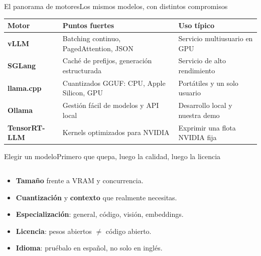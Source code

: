 \begin{frame}{El panorama de motores}{Los mismos modelos, con distintos compromisos}
	\centering\footnotesize
	\setlength{\tabcolsep}{3pt}
	\begin{tabular}{@{}R{2.1cm}R{6.2cm}R{3.9cm}@{}}
		\toprule
		\textbf{Motor}                     & \textbf{Puntos fuertes}                    & \textbf{Uso típico}             \\
		\midrule
		\textbf{\textcolor{rojoUGR}{vLLM}} & Batching continuo, PagedAttention, JSON    & Servicio multiusuario en GPU    \\[1pt]
		\textbf{SGLang}                    & Caché de prefijos, generación estructurada & Servicio de alto rendimiento    \\[1pt]
		\textbf{llama.cpp}                 & Cuantizados GGUF: CPU, Apple Silicon, GPU  & Portátiles y un solo usuario    \\[1pt]
		\textbf{Ollama}                    & Gestión fácil de modelos y API local       & Desarrollo local y nuestra demo \\[1pt]
		\textbf{TensorRT-LLM}              & Kernels optimizados para NVIDIA            & Exprimir una flota NVIDIA fija  \\
		\bottomrule
	\end{tabular}
\end{frame}

\begin{frame}{Elegir un modelo}{Primero que quepa, luego la calidad, luego la licencia}
	\begin{columns}[T]
		\begin{column}{0.5\textwidth}
			\footnotesize
			\begin{itemize}
				\item \textbf{Tamaño} frente a VRAM y concurrencia.
				\item \textbf{Cuantización} y \textbf{contexto} que realmente necesitas.
				\item \textbf{Especialización}: general, código, visión, embeddings.
				\item \textbf{Licencia}: pesos abiertos $\neq$ código abierto.
				\item \textbf{Idioma}: pruébalo en español, no solo en inglés.
			\end{itemize}
		\end{column}
		\begin{column}{0.46\textwidth}
		\end{column}
	\end{columns}
\end{frame}

